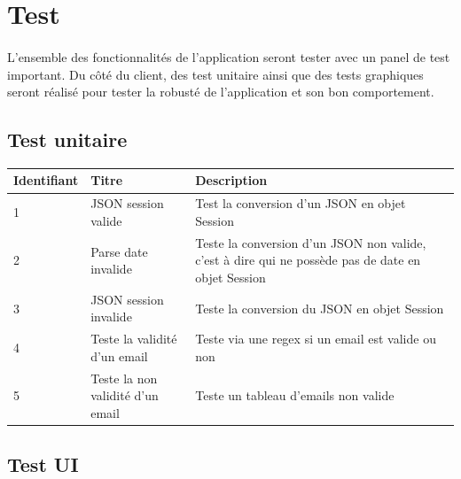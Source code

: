 \documentclass[titlepage, 12pt]{report}
\begin{document}
\clearpage


\section{Test}

\paragraph{}L'ensemble des fonctionnalités de l'application seront tester avec un panel de test important. Du côté du client, des test unitaire ainsi que des tests graphiques seront réalisé pour tester la robusté de l'application et son bon comportement.

\subsection{Test unitaire}

\begin{table}[ht]
\begin{tabularx}{\textwidth}{|X|X|X|}
	\hline
	Identifiant & Titre & Description \\
	\hline
	1 & JSON session valide & Test la conversion d'un JSON en objet Session \\
	\hline
	2 & Parse date invalide & Teste la conversion d'un JSON non valide, c'est à dire qui ne possède pas de date en objet Session \\
	\hline
	3 & JSON session invalide & Teste la conversion du JSON en objet Session \\
	\hline
	4 & Teste la validité d'un email & Teste via une regex si un email est valide ou non \\
	\hline
	5 & Teste la non validité d'un email & Teste un tableau d'emails non valide \\
	\hline \hline
\end{tabularx}
\end{table}

\subsection{Test UI}
\end{document}
